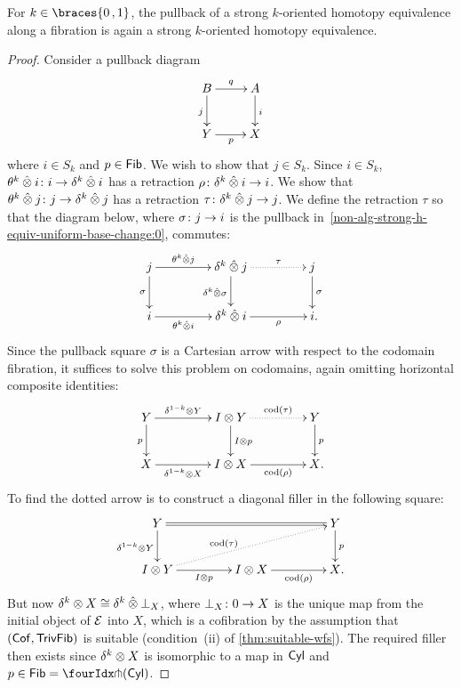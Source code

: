 \documentclass[reqno,10pt,a4paper,oneside,draft]{amsart}
\begin{document}
{{\begin{lemma} 
\label{thm:non-alg-frobenius-she}
For $k \in \braces{0 \, , 1}$, the pullback of a strong $k$-oriented homotopy equivalence along a fibration is again a strong $k$-oriented 
homotopy equivalence.
\end{lemma} 

\begin{proof} Consider a pullback diagram
\begin{equation}
\label{non-alg-strong-h-equiv-uniform-base-change:0}
\begin{gathered}
\xymatrix{
 B \ar[d]_j \ar[r]^q & A \ar[d]^i \\ 
Y \ar[r]_p & X }
\end{gathered}
\end{equation}
where $i  \in S_k$ and $p \in \mathsf{Fib}$. We wish to show that $j \in  S_k$. Since $i \in S_k$, $\theta^k \mathbin{\hat{\otimes}} i \colon i \to \delta^k \mathbin{\hat{\otimes}} i$ has a retraction $\rho \colon \delta^k \mathbin{\hat{\otimes}} i \to i$.  We show that $\theta^k \mathbin{\hat{\otimes}} j \colon j \to \delta^k \mathbin{\hat{\otimes}} j$ has a retraction 
$\tau \colon  \delta^k \mathbin{\hat{\otimes}} j \to j$. We define the retraction $\tau$ so that the diagram below, where $\sigma \colon j \to i$ is 
the pullback in~\eqref{non-alg-strong-h-equiv-uniform-base-change:0}, commutes:
\[
\xymatrix@C+2em{
j 
  \ar[r]^-{\thetak \hatotimes j}
  \ar[d]_{\sigma}
&
  \kcyl \hatotimes j 
  \ar@{.>}[r]^-{\tau}
  \ar[d]_{\kcyl \hatotimes \sigma}
&
 j 
  \ar[d]^{\sigma}
\\
  i
  \ar[r]_-{\thetak \hatotimes i}
&
  \kcyl \hatotimes i
  \ar[r]_-{\rho}
&
  i
\rlap{.}}
\]
Since the pullback square $\sigma$ is a Cartesian arrow with respect to the codomain fibration, it suffices to solve this problem on codomains, again omitting horizontal composite identities:
\[
\xymatrix@C+2em{
  Y
  \ar[r]^-{\kcylinv \otimes Y}
  \ar[d]_{p}
&
  \interval \otimes Y
  \ar@{.>}[r]^-{\cod(\tau)}
  \ar[d]^{\interval \otimes p}
&
  Y
  \ar[d]^{p}
\\
  X
  \ar[r]_-{\kcylinv \otimes X}
&
  \interval \otimes X
  \ar[r]_-{\cod(\rho)}
&
  X
\rlap{.}}
\]
To find the dotted arrow is to construct a diagonal filler in the following square:
\[
\xymatrix@C+2em{
  Y
  \ar@{=}[rr]
  \ar[d]_{\kcylinv \otimes Y}
&&
  Y
  \ar[d]^{p}
\\
  \interval \otimes Y
  \ar[r]_-{I \otimes p}
  \ar@{.>}[urr]^(0.4){\cod(\tau)}
&
  \interval \otimes X
  \ar[r]_-{\cod(\rho)}
&
  X
\rlap{.}}
\]
But now $\delta^k \otimes X \cong 
\delta^k \mathbin{\hat{\otimes}} \bot_X$, where $\bot_X \colon 0 \to X$ is the unique map from the initial object of $\mathcal{E}$ into $X$, which is 
a cofibration by the assumption that $(\mathsf{Cof}, \mathsf{TrivFib})$ is suitable (condition~(ii) of \cref{thm:suitable-wfs}). The required
filler then exists since $\delta^k \otimes X$
is isomorphic to a map in $\mathsf{Cyl}$ and~$p \in \Fib = \liftr{(\Cyl)}$.
\end{proof} 


}}
\end{document}

